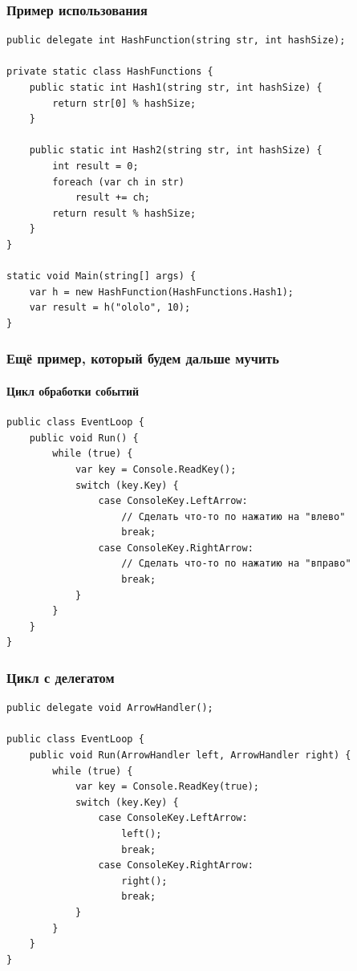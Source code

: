 \documentclass[xetex,mathserif,serif]{beamer}
\begin{document}
	\begin{frame}[fragile]
		\frametitle{Пример использования}
		\begin{scriptsize}
			\begin{verbatim}
public delegate int HashFunction(string str, int hashSize);

private static class HashFunctions {
    public static int Hash1(string str, int hashSize) {
        return str[0] % hashSize;
    }

    public static int Hash2(string str, int hashSize) {
        int result = 0;
        foreach (var ch in str)
            result += ch;
        return result % hashSize;
    }
}

static void Main(string[] args) {
    var h = new HashFunction(HashFunctions.Hash1);
    var result = h("ololo", 10);
}
			\end{verbatim}
		\end{scriptsize}
	\end{frame}

	\begin{frame}[fragile]
		\frametitle{Ещё пример, который будем дальше мучить}
		\framesubtitle{Цикл обработки событий}
		\begin{footnotesize}
			\begin{verbatim}
public class EventLoop {
    public void Run() {
        while (true) {
            var key = Console.ReadKey();
            switch (key.Key) {
                case ConsoleKey.LeftArrow:
                    // Сделать что-то по нажатию на "влево"
                    break;
                case ConsoleKey.RightArrow:
                    // Сделать что-то по нажатию на "вправо"
                    break;
            }
        }
    }
}
			\end{verbatim}
		\end{footnotesize}
	\end{frame}

	\begin{frame}[fragile]
		\frametitle{Цикл с делегатом}
		\begin{footnotesize}
			\begin{verbatim}
public delegate void ArrowHandler();

public class EventLoop {
    public void Run(ArrowHandler left, ArrowHandler right) {
        while (true) {
            var key = Console.ReadKey(true);
            switch (key.Key) {
                case ConsoleKey.LeftArrow:
                    left();
                    break;
                case ConsoleKey.RightArrow:
                    right();
                    break;
            }
        }
    }
}
			\end{verbatim}
		\end{footnotesize}
	\end{frame}
\end{document}
